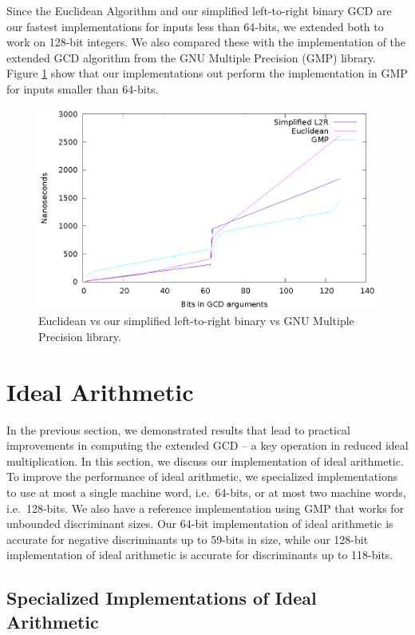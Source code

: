 \documentclass{ucalgthes1}
\theoremstyle{definition}
\begin{document}
Since the Euclidean Algorithm and our simplified left-to-right binary GCD are our fastest implementations for inputs less than 64-bits, we extended both to work on 128-bit integers.  We also compared these with the implementation of the extended GCD algorithm from the GNU Multiple Precision (GMP) library.  Figure \ref{fig:mpzgcd} show that our implementations out perform the implementation in GMP for inputs smaller than 64-bits.
\begin{figure}[H]
\centering
\includegraphics{mpzgcd}
\caption{Euclidean vs our simplified left-to-right binary vs GNU Multiple Precision library.}
\label{fig:mpzgcd}
\end{figure}


\bigbreak
\section{Ideal Arithmetic}
\label{sec:idealArithmetic}

In the previous section, we demonstrated results that lead to practical improvements in computing the extended GCD -- a key operation in reduced ideal multiplication.  In this section, we discuss our implementation of ideal arithmetic.  To improve the performance of ideal arithmetic, we specialized implementations to use at most a single machine word, i.e.\ 64-bits, or at most two machine words, i.e.\ 128-bits.  We also have a reference implementation using GMP that works for unbounded discriminant sizes.  Our 64-bit implementation of ideal arithmetic is accurate for negative discriminants up to 59-bits  in size, while our 128-bit implementation of ideal arithmetic is accurate for discriminants up to 118-bits.

\subsection{Specialized Implementations of Ideal Arithmetic}
\end{document}

